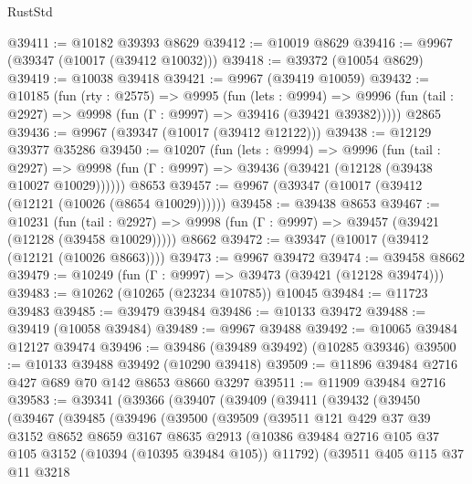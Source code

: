 \begin{lexlean}{RustStd}
\begin{coremodule}
@39411 := @10182 @39393 @8629
@39412 := @10019 @8629
@39416 := @9967 (@39347 (@10017 (@39412 @10032)))
@39418 := @39372 (@10054 @8629)
@39419 := @10038 @39418
@39421 := @9967 (@39419 @10059)
@39432 := @10185
    (fun (rty : @2575) =>
    @9995
      (fun (lets : @9994) =>
      @9996 (fun (tail : @2927) => @9998 (fun (Γ : @9997) => @39416 (@39421 @39382)))))
    @2865
@39436 := @9967 (@39347 (@10017 (@39412 @12122)))
@39438 := @12129 @39377 @35286
@39450 := @10207
    (fun (lets : @9994) =>
    @9996
      (fun (tail : @2927) =>
      @9998 (fun (Γ : @9997) => @39436 (@39421 (@12128 (@39438 @10027 @10029))))))
    @8653
@39457 := @9967 (@39347 (@10017 (@39412 (@12121 (@10026 (@8654 @10029))))))
@39458 := @39438 @8653
@39467 := @10231
    (fun (tail : @2927) => @9998 (fun (Γ : @9997) => @39457 (@39421 (@12128 (@39458 @10029)))))
    @8662
@39472 := @39347 (@10017 (@39412 (@12121 (@10026 @8663))))
@39473 := @9967 @39472
@39474 := @39458 @8662
@39479 := @10249 (fun (Γ : @9997) => @39473 (@39421 (@12128 @39474)))
@39483 := @10262 (@10265 (@23234 @10785)) @10045
@39484 := @11723 @39483
@39485 := @39479 @39484
@39486 := @10133 @39472
@39488 := @39419 (@10058 @39484)
@39489 := @9967 @39488
@39492 := @10065 @39484 @12127 @39474
@39496 := @39486 (@39489 @39492) (@10285 @39346)
@39500 := @10133 @39488 @39492 (@10290 @39418)
@39509 := @11896 @39484 @2716 @427 @689 @70 @142 @8653 @8660 @3297
@39511 := @11909 @39484 @2716
@39583 := @39341
    (@39366
      (@39407
        (@39409
          (@39411
            (@39432
              (@39450
                (@39467
                  (@39485
                    (@39496
                      (@39500
                        (@39509
                          (@39511
                            @121
                            @429
                            @37
                            @39
                            @3152
                            @8652
                            @8659
                            @3167
                            @8635
                            @2913
                            (@10386
                              @39484
                              @2716
                              @105
                              @37
                              @105
                              @3152
                              (@10394 (@10395 @39484 @105))
                              @11792)
                            (@39511
                              @405
                              @115
                              @37
                              @11
                              @3218

\end{coremodule}
\end{lexlean}
